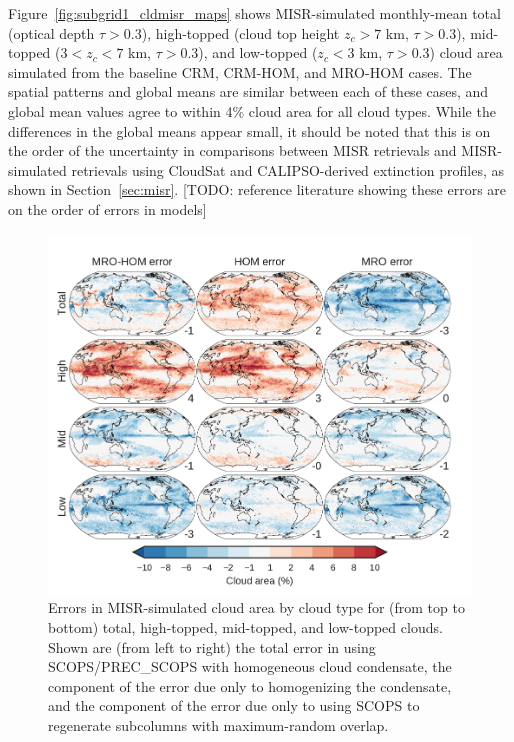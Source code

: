 Figure~\ref{fig:subgrid1_cldmisr_maps} shows MISR-simulated monthly-mean
total (optical depth \(\tau > 0.3\)), high-topped (cloud top height
\(z_c > 7\) km, \(\tau > 0.3\)), mid-topped (\(3 < z_c < 7\) km,
\(\tau > 0.3\)), and low-topped (\(z_c < 3\) km, \(\tau > 0.3\)) cloud
area simulated from the baseline CRM, CRM-HOM, and MRO-HOM cases. The
spatial patterns and global means are similar between each of these
cases, and global mean values agree to within 4\% cloud area for all
cloud types. While the differences in the global means appear small, it
should be noted that this is on the order of the uncertainty in
comparisons between MISR retrievals and MISR-simulated retrievals using
CloudSat and CALIPSO-derived extinction profiles, as shown in
Section~\ref{sec:misr}. {[}TODO: reference literature showing these
errors are on the order of errors in models{]}

\begin{figure}[htbp]
\centering
\includegraphics{graphics/subgrid1_cldmisr_maps_diff.pdf}
\caption{\label{fig:subgrid1_cldmisr_maps_diff}Errors in MISR-simulated
cloud area by cloud type for (from top to bottom) total, high-topped,
mid-topped, and low-topped clouds. Shown are (from left to right) the
total error in using SCOPS/PREC\_SCOPS with homogeneous cloud
condensate, the component of the error due only to homogenizing the
condensate, and the component of the error due only to using SCOPS to
regenerate subcolumns with maximum-random
overlap.}\label{fig:subgrid1ux5fcldmisrux5fmapsux5fdiff}
\end{figure}

